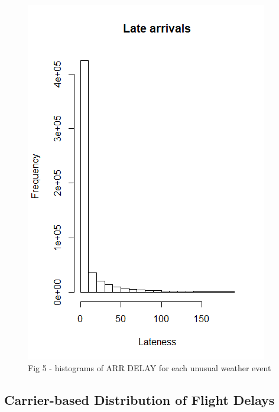 \documentclass[12pt, a4paper, openany]{book}
\begin{document}
	 		\begin{figure}[h]
	 		\includegraphics[width = .75 \textwidth]{../figures/LateArrivalsHistogram}
	 		\caption{Fig 5 - histograms of ARR DELAY for each unusual weather event}
	 		\end{figure}
		\subsection{Carrier-based Distribution of Flight Delays}
			
\end{document}
